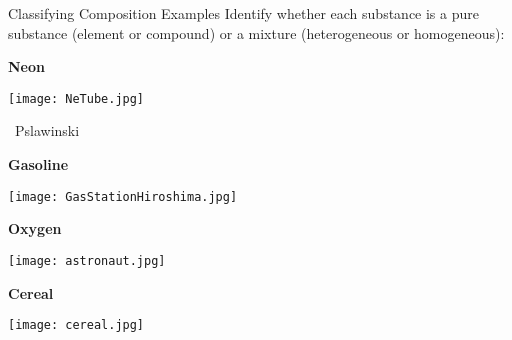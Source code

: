 \documentclass[10pt,letterpaper]{article}
\begin{document}
\begin{frame}[t]{Classifying Composition Examples}
	Identify whether each substance is a \alert{pure substance} (element or
	compound) or a \alert{mixture} (heterogeneous or homogeneous):
	
	\begin{center}
		\begin{minipage}[t]{0.3\linewidth}
			\centering
			\textbf{Neon} 

			\medskip

			\texttt{[image: NeTube.jpg]}

			\medskip
			
			\tiny{\ccbysa\ Pslawinski}
		\end{minipage}
		\qquad
		\begin{minipage}[t]{0.3\linewidth}
			\centering
			\textbf{Gasoline}

			\medskip

			\texttt{[image: GasStationHiroshima.jpg]}
		\end{minipage}

		\bigskip

		\begin{minipage}[t]{0.3\linewidth}
			\centering
			\textbf{Oxygen}

			\medskip

			\texttt{[image: astronaut.jpg]}
		\end{minipage}
		\qquad
		\begin{minipage}[t]{0.3\linewidth}
			\centering
			\textbf{Cereal}

			\medskip

			\texttt{[image: cereal.jpg]}
		\end{minipage}
	\end{center}
	
\end{frame}

%	
\end{document}

